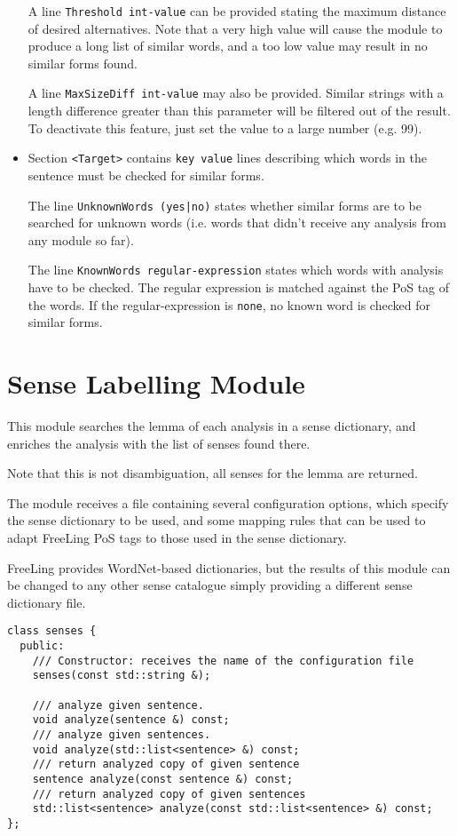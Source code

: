 \documentclass[a4paper]{book}
\begin{document}
\begin{itemize}
    A line \verb#Threshold int-value# can be provided stating the maximum distance
    of desired alternatives.  Note that a very high value will cause the module 
    to produce a long list of similar words, and a too low value may result in no
    similar forms found.
 
    A line \verb#MaxSizeDiff int-value# may also be provided. Similar strings with 
    a length difference greater than this parameter will be filtered out of the 
    result. To deactivate this feature, just set the value to a large number (e.g. 99).

  \item Section \verb#<Target># contains \verb#key value# lines describing 
    which words in the sentence must be checked for similar forms.

    The line \verb#UnknownWords (yes|no)# states whether similar forms are 
    to be searched for unknown words (i.e. words
    that didn't receive any analysis from any module so far).

    The line \verb#KnownWords regular-expression# states which words with analysis
    have to be checked.  The regular expression is matched against the PoS tag of the
    words.  If the regular-expression is \verb#none#, no known word is checked for
    similar forms.
\end{itemize}

\section{Sense Labelling Module}
\label{mod-sense}

  This module searches the lemma of each analysis in a sense dictionary,
  and enriches the analysis with the list of senses found there.

  Note that this is not disambiguation, all senses for the lemma are returned. 

  The module receives a file containing several configuration options, which
  specify the sense dictionary to be used, and some mapping rules that can be 
  used to adapt FreeLing PoS tags to those used in the sense dictionary.

  FreeLing provides WordNet-based \cite{fellbaum98,vossen98a}
  dictionaries, but the results of this module can be changed to any
  other sense catalogue simply providing a different sense dictionary
  file.

\begin{verbatim}
class senses {
  public:
    /// Constructor: receives the name of the configuration file
    senses(const std::string &); 
 
    /// analyze given sentence.
    void analyze(sentence &) const;
    /// analyze given sentences.
    void analyze(std::list<sentence> &) const;
    /// return analyzed copy of given sentence
    sentence analyze(const sentence &) const;
    /// return analyzed copy of given sentences
    std::list<sentence> analyze(const std::list<sentence> &) const;
};
\end{verbatim}
\end{document}
